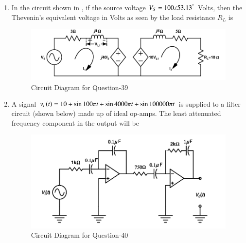 \documentclass[journal,12pt,onecolumn]{IEEEtran}
\theoremstyle{remark}
\begin{document}
\begin{enumerate}
\item In the circuit shown in , if the source voltage $V_S = 100 \angle 53.13^{\degree}$ Volts, then the Thevenin's equivalent voltage in Volts as seen by the load resistance $R_L$ is  
\par \hfill{}
\begin{figure}[H]
\centering
\includegraphics[width=0.7\columnwidth]{Figs/Q-39.png}
\caption{Circuit Diagram for Question-39}
\label{39}
\end{figure}
\begin{enumerate}
\end{enumerate}

\item A signal $v_i\left(t\right) = 10+ \sin 100 \pi t + \sin 4000 \pi t + \sin 100000 \pi t$ is supplied to a filter circuit (shown below) made up of ideal op-amps. The least attenuated frequency component in the output will be  
\par \hfill{}
\begin{figure}[H]
\centering
\includegraphics[width=0.6\columnwidth]{Figs/Q-40.png}
\caption{Circuit Diagram for Question-40}
\label{40}
\end{figure}
\begin{enumerate}
\end{enumerate}


\end{enumerate}
\end{document}
